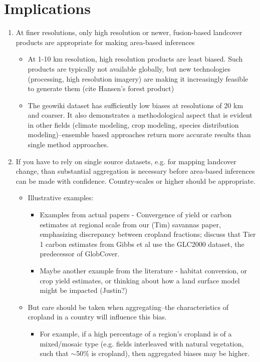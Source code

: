 \documentclass[11 pt]{article}
\begin{document}
\section*{Implications}
\begin{enumerate}
  \item At finer resolutions, only high resolution or newer, fusion-based landcover products are appropriate for making area-based inferences
    \begin{itemize}
      \item At 1-10 km resolution, high resolution products are least biased. Such products are typically not available globally, but new technologies (processing, high resolution imagery) are making it increasingly feasible to generate them (cite Hansen's forest product)
      \item The geowiki dataset has sufficiently low biases at resolutions of 20 km and coarser. It also demonstrates a methodological aspect that is evident in other fields (climate modeling, crop modeling, species distribution modeling)--ensemble based approaches return more accurate results than single method approaches.  
    \end{itemize}
  \item If you have to rely on single source datasets, e.g. for mapping landcover change, than substantial aggregation is necessary before area-based inferences can be made with confidence. Country-scales or higher should be appropriate. 
  \begin{itemize} 
    \item Illustrative examples: 
      \begin{itemize} 
        \item Examples from actual papers - Convergence of yield or carbon estimates at regional scale from our (Tim) savannas paper, emphasizing discrepancy between cropland fractions; discuss that Tier 1 carbon estimates from Gibbs et al use the GLC2000 dataset, the predecessor of GlobCover.  
         \item Maybe another example from the literature - habitat conversion, or crop yield estimates, or thinking about how a land surface model might be impacted (Justin?)
      \end{itemize}
    \item But care should be taken when aggregating--the characteristics of cropland in a country will influence this bias. 
      \begin{itemize}
        \item For example, if a high percentage of a region's cropland is of a mixed/mosaic type (e.g. fields interleaved with natural vegetation, such that $\sim$50\% is cropland), then aggregated biases may be higher.  

\end{itemize}
\end{itemize}
\end{enumerate}
\end{document}
